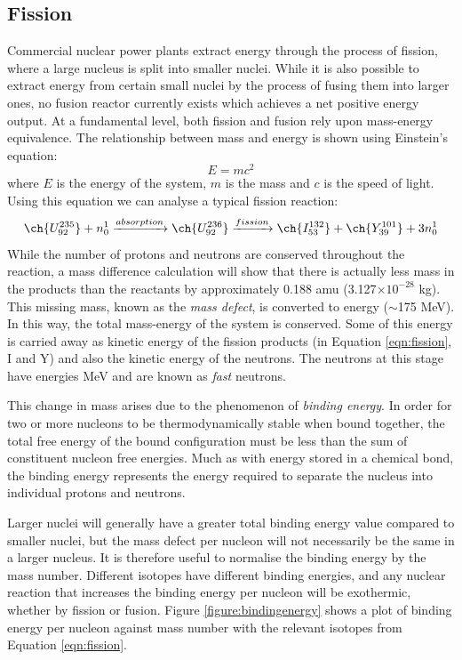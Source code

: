 \subsection{Fission}

Commercial nuclear power plants extract energy through the process of fission, where a large nucleus is split into smaller nuclei. While it is also possible to extract energy from certain small nuclei by the process of fusing them into larger ones, no fusion reactor currently exists which achieves a net positive energy output. At a fundamental level, both fission and fusion rely upon mass-energy equivalence. The relationship between mass and energy is shown using Einstein's equation:
\begin{equation}
\label{emc2}
    E = mc^{2}
\end{equation}
where $E$ is the energy of the system, $m$ is the mass and $c$ is the speed of light. Using this equation we can analyse a typical fission reaction:
\begin{equation}
    \ch{U^{235}_{92}} + n^{1}_{0} \xrightarrow[]{absorption} \ch{U^{236}_{92}} \xrightarrow[]{fission} \ch{I^{132}_{53}} + \ch{Y^{101}_{39}} + 3n^{1}_{0}
\label{eqn:fission} 
\end{equation}
While the number of protons and neutrons are conserved throughout the reaction, a mass difference calculation will show that there is actually less mass in the products than the reactants by approximately 0.188 amu (3.127$\times 10^{-28}$ kg). This missing mass, known as the \emph{mass defect}, is converted to energy ($\sim$175 MeV). In this way, the total mass-energy of the system is conserved. Some of this energy is carried away as kinetic energy of the fission products (in Equation \ref{eqn:fission}, I and Y) and also the kinetic energy of the neutrons. The neutrons at this stage have energies  MeV and are known as \emph{fast} neutrons.

This change in mass arises due to the phenomenon of \emph{binding energy}. In order for two or more nucleons to be thermodynamically stable when bound together, the total free energy of the bound configuration must be less than the sum of constituent nucleon free energies. Much as with energy stored in a chemical bond, the binding energy represents the energy required to separate the nucleus into individual protons and neutrons. 

Larger nuclei will generally have a greater total binding energy value compared to smaller nuclei, but the mass defect per nucleon will not necessarily be the same in a larger nucleus. It is therefore useful to normalise the binding energy by the mass number. Different isotopes have different binding energies, and any nuclear reaction that increases the binding energy per nucleon will be exothermic, whether by fission or fusion. Figure \ref{figure:bindingenergy} shows a plot of binding energy per nucleon against mass number with the relevant isotopes from Equation \ref{eqn:fission}. 

